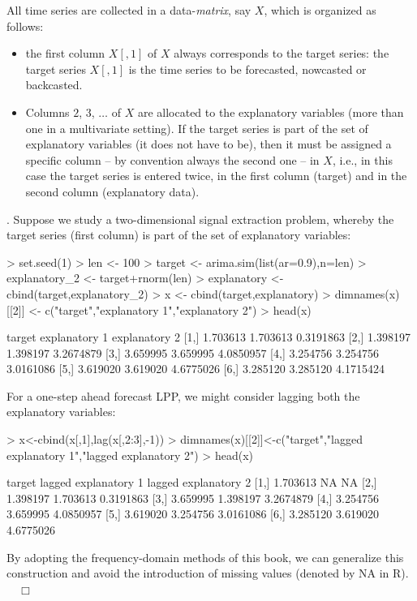 \documentclass[a4paper]{book}
\begin{document}
All time series are collected in a data-\emph{matrix}, say $X$, which is organized as follows: 
\begin{itemize}
\item the first column $X[,1]$ of $X$ always corresponds to the target series: the target series $X[,1]$ is the time series
 to be forecasted, nowcasted or backcasted.
\item Columns $2$, $3$, $\ldots$ of $X$ are allocated to the explanatory variables (more than one in a multivariate setting). 
If the target series is part of the set of explanatory variables (it does not have to be), then it must be assigned a specific column 
-- by convention always the second one -- in $X$, i.e., in this case the target series is entered twice, in the first column (target) and
  in the second column (explanatory data).     
\end{itemize}

.  Suppose we study a  two-dimensional signal extraction problem, whereby the target series (first column) 
is part of the set of explanatory variables:
\begin{Schunk}
\begin{Sinput}
> set.seed(1)
> len <- 100
> target <- arima.sim(list(ar=0.9),n=len)
> explanatory_2 <- target+rnorm(len)
> explanatory <- cbind(target,explanatory_2)
> x <- cbind(target,explanatory)
> dimnames(x)[[2]] <- c("target","explanatory 1","explanatory 2")
> head(x)
\end{Sinput}
\begin{Soutput}
       target explanatory 1 explanatory 2
[1,] 1.703613      1.703613     0.3191863
[2,] 1.398197      1.398197     3.2674879
[3,] 3.659995      3.659995     4.0850957
[4,] 3.254756      3.254756     3.0161086
[5,] 3.619020      3.619020     4.6775026
[6,] 3.285120      3.285120     4.1715424
\end{Soutput}
\end{Schunk}
For a one-step ahead forecast LPP, we might consider lagging both the explanatory variables:
\begin{Schunk}
\begin{Sinput}
> x<-cbind(x[,1],lag(x[,2:3],-1))
> dimnames(x)[[2]]<-c("target","lagged explanatory 1","lagged explanatory 2")
> head(x)
\end{Sinput}
\begin{Soutput}
       target lagged explanatory 1 lagged explanatory 2
[1,] 1.703613                   NA                   NA
[2,] 1.398197             1.703613            0.3191863
[3,] 3.659995             1.398197            3.2674879
[4,] 3.254756             3.659995            4.0850957
[5,] 3.619020             3.254756            3.0161086
[6,] 3.285120             3.619020            4.6775026
\end{Soutput}
\end{Schunk}
 By adopting the frequency-domain methods of this book, we can generalize this construction and
    avoid the introduction of missing values (denoted by NA in R).  $\quad \Box$
\end{document}

